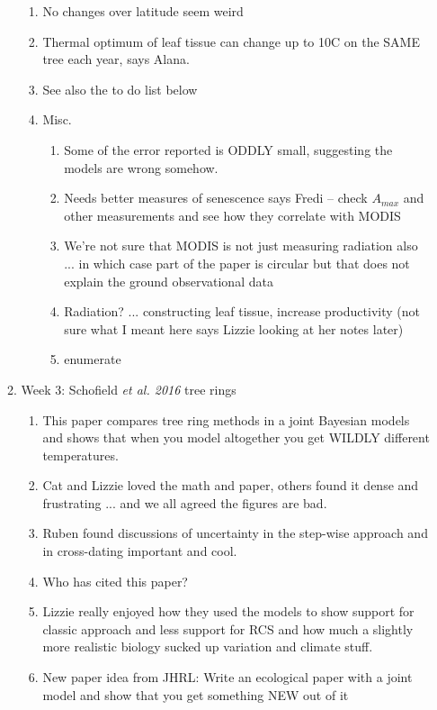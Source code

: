 \documentclass[11pt,letter]{article}
\begin{document}
\begin{enumerate}
\begin{enumerate}
\begin{enumerate}
\item No changes over latitude seem weird 
\item Thermal optimum of leaf tissue can change up to 10C on the SAME tree each year, says Alana. 
\item See also the to do list below
\item Misc.
\begin{enumerate}
\item Some of the error reported is ODDLY small, suggesting the models are wrong somehow.
\item Needs better measures of senescence says Fredi -- check $A_{max}$ and other measurements and see how they correlate with MODIS
\item We're not sure that MODIS is not just measuring radiation also ... in which case part of the paper is circular but that does not explain the ground observational data
\item Radiation? ... constructing leaf tissue, increase productivity (not sure what I meant here says Lizzie looking at her notes later)
\item{enumerate}
\end{enumerate}
\end{enumerate}
\item Week 3: Schofield \emph{et al. 2016} tree rings
\begin{enumerate}
\item This paper compares tree ring methods in a joint Bayesian models and shows that when you model altogether you get WILDLY different temperatures. 
\item Cat and Lizzie loved the math and paper, others found it dense and frustrating ... and we all agreed the figures are bad.
\item Ruben found discussions of uncertainty in the step-wise approach and in cross-dating important and cool.
\item Who has cited this paper?
\item Lizzie really enjoyed how they used the models to show support for classic approach and less support for RCS and how much a slightly more realistic biology sucked up variation and climate stuff. 
\item New paper idea from JHRL: Write an ecological paper with a joint model and show that you get something NEW out of it 
\end{enumerate}
\end{enumerate}



\end{enumerate}
\end{document}
